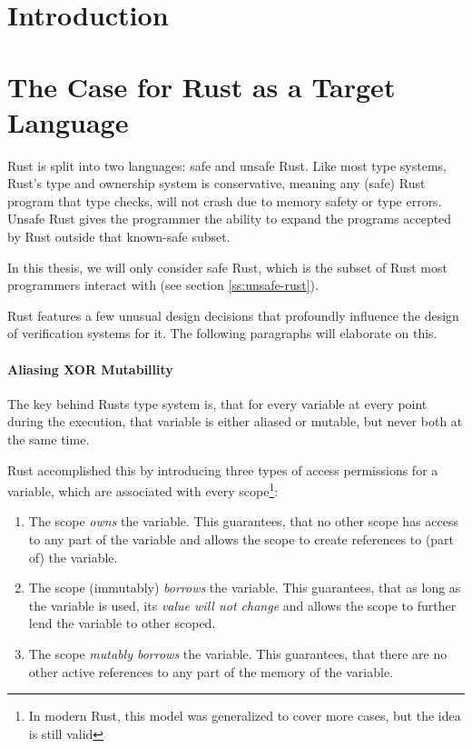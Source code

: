 \documentclass{article}
\theoremstyle{definition}
\begin{document}
\tableofcontents

\section{Introduction}

\section{The Case for Rust as a Target Language}

Rust is split into two languages: safe and unsafe Rust. Like most type systems, Rust's type and ownership system is conservative, meaning any (safe) Rust program that type checks, will not crash due to memory safety or type errors. Unsafe Rust gives the programmer the ability to expand the programs accepted by Rust outside that known-safe subset.

In this thesis, we will only consider safe Rust, which is the subset of Rust most programmers interact with (see section \ref{ss:unsafe-rust}).

Rust features a few unusual design decisions that profoundly influence the design of verification systems for it. The following paragraphs will elaborate on this.

\paragraph{Aliasing XOR Mutabillity} The key behind Rusts type system is, that for every variable at every point during the execution, that variable is either aliased or mutable, but never both at the same time. 

Rust accomplished this by introducing three types of access permissions for a variable, which are associated with every scope\footnote{In modern Rust, this model was generalized to cover more cases, but the idea is still valid}:
\begin{enumerate}
  \item The scope \textit{owns} the variable. This guarantees, that no other scope has access to any part of the variable and allows the scope to create references to (part of) the variable. 
  \item The scope (immutably) \textit{borrows} the variable. This guarantees, that as long as the variable is used, its \textit{value will not change} and allows the scope to further lend the variable to other scoped.
  \item The scope \textit{mutably borrows} the variable. This guarantees, that there are no other active references to any part of the memory of the variable. 
\end{enumerate}
\end{document}
